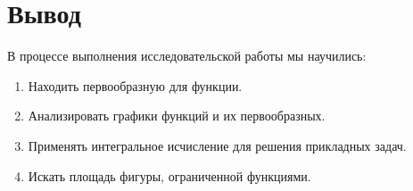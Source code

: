\section{Вывод}
В процессе выполнения исследовательской работы мы научились:
\begin{enumerate}
  \item Находить первообразную для функции.
  \item Анализировать графики функций и их первообразных.
  \item Применять интегральное исчисление для решения прикладных задач.
  \item Искать площадь фигуры, ограниченной функциями.
\end{enumerate}
